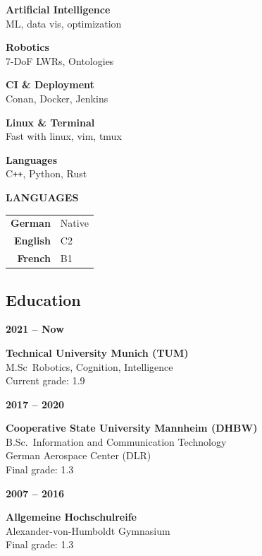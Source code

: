 \documentclass[a4paper, 10pt]{article}
\newcommand{\CVEntry}[3]{
    \begin{minipage}[t]{0.23\textwidth}
        \textbf{#1}
    \end{minipage}%
    \begin{minipage}[t]{0.76\textwidth}
        \textbf{#2}\\
        #3
    \end{minipage}%
}
\begin{document}
\begin{tcbraster}[raster columns=7]
\begin{tcolorbox}[left=4pt, right=4pt, top=4pt, height=1.0\textheight, colback=sidebar, boxrule=0.5pt, arc=8pt, frame empty, raster multicolumn=2, nobeforeafter]
    \begin{keyskills}
        \item \textbf{Artificial Intelligence}\\ ML, data vis, optimization
        \item \textbf{Robotics}\\ 7-DoF LWRs, Ontologies
        \item \textbf{CI \& Deployment}\\ Conan, Docker, Jenkins
        \item \textbf{Linux \& Terminal}\\ Fast with linux, vim, tmux
        \item \textbf{Languages}\\ C{}\verb|++|, Python, Rust
    \end{keyskills}

    \vspace{8mm}
    \begin{center}
        {\textbf{LANGUAGES}} \\
    \end{center}
    \begin{center}
        \begin{tabular}[c]{rl}
            \textbf{German} & Native \\
            \textbf{English} & C2 \\
            \textbf{French} & B1 \\
        \end{tabular}
    \end{center}


\end{tcolorbox}
\begin{tcolorbox}[left=1cm, height=1.0\textheight, colback=white, raster multicolumn=5, boxrule=0pt, frame empty, nobeforeafter]
    \section*{Education}
    \CVEntry{2021 -- Now}{Technical University Munich (TUM)}{
        M.Sc\ Robotics, Cognition, Intelligence\\
        Current grade: 1.9\\
    }
    \CVEntry{2017 -- 2020}{Cooperative State University Mannheim (DHBW)}{
        B.Sc.\ Information and Communication Technology\\
        German Aerospace Center (DLR)\\
        Final grade: 1.3\\
    }
    \CVEntry{2007 -- 2016}{Allgemeine Hochschulreife}{
        Alexander-von-Humboldt Gymnasium\\
        Final grade: 1.3\\
    }
    \vspace{5mm}

\end{tcolorbox}
\end{tcbraster}
\end{document}
